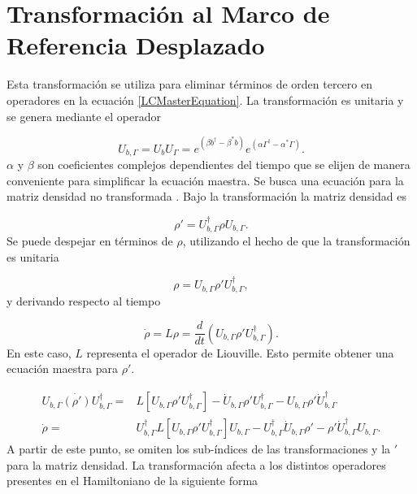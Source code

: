 \documentclass[10pt,a4paper]{report}
\begin{document}
\section{Transformación al Marco de Referencia Desplazado}

Esta transformación se utiliza para eliminar términos de orden tercero en operadores en la ecuación \eqref{LCMasterEquation}. La transformación es unitaria y se genera mediante el operador

\begin{equation}
U_{b,\Gamma} =  U_b U_\Gamma = e^{(\beta b^\dagger - \beta^* b)}e^{(\alpha\Gamma^\dagger - \alpha^* \Gamma)}.
\end{equation} $\alpha$ y $\beta$ son coeficientes complejos dependientes del tiempo que se elijen de manera conveniente para simplificar la ecuación maestra. Se busca una ecuación para la matriz densidad no transformada \cite{TesisMaestria}. Bajo la transformación la matriz densidad es

\begin{equation}
\rho' = U_{b,\Gamma}^\dagger \rho U_{b,\Gamma}.
\end{equation} Se puede despejar en términos de $\rho$, utilizando el hecho de que la transformación es unitaria

\begin{equation}
\rho = U_{b,\Gamma} \rho' U_{b,\Gamma}^\dagger,
\end{equation}y derivando respecto al tiempo

\begin{equation}
\dot{\rho} = L\rho = \frac{d}{dt}(U_{b,\Gamma} \rho' U_{b,\Gamma}^\dagger).
\end{equation} En este caso, $L$ representa el operador de Liouville. Esto permite obtener una ecuación maestra para $\rho'$. 

\begin{align}
 U_{b,\Gamma} \dot{(\rho')} U_{b,\Gamma}^\dagger =& L[U_{b,\Gamma} \rho' U_{b,\Gamma}^\dagger] - \dot{U}_{b,\Gamma}\rho'U_{b,\Gamma}^\dagger -U_{b,\Gamma} \rho' \dot{U}_{b,\Gamma}^\dagger\\
\dot{\rho} =& U_{b,\Gamma}^\dagger L[U_{b,\Gamma} \rho' U_{b,\Gamma}^\dagger]U_{b,\Gamma}-U_{b,\Gamma}^\dagger\dot{U}_{b,\Gamma}\rho'-\rho'\dot{U}_{b,\Gamma}^\dagger U_{b,\Gamma}.
\end{align} A partir de este punto, se omiten los sub-índices de las transformaciones y la $'$ para la matriz densidad. La transformación afecta a los distintos operadores presentes en el Hamiltoniano de la siguiente forma
\end{document}
